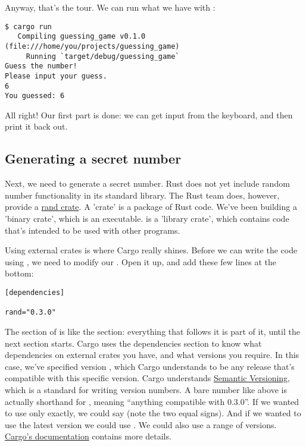 \blank

Anyway, that's the tour. We can run what we have with :

\begin{verbatim}
$ cargo run
   Compiling guessing_game v0.1.0 (file:///home/you/projects/guessing_game)
     Running `target/debug/guessing_game`
Guess the number!
Please input your guess.
6
You guessed: 6
\end{verbatim}

All right! Our first part is done: we can get input from the keyboard, and then print it back out.

\subsection{Generating a secret number}

Next, we need to generate a secret number. Rust does not yet include random number functionality in its standard library. 
The Rust team does, however, provide a \href{https://crates.io/crates/rand}{rand crate}. A 'crate' is a package of Rust 
code. We've been building a 'binary crate', which is an executable.  is a 'library crate', which contains code 
that's intended to be used with other programs.

\blank

Using external crates is where Cargo really shines. Before we can write the code using , we need to modify our 
. Open it up, and add these few lines at the bottom:

\begin{verbatim}
[dependencies]

rand="0.3.0"
\end{verbatim}

The \code{[dependencies]} section of  is like the \code{[package]} section: everything that follows it is part 
of it, until the next section starts. Cargo uses the dependencies section to know what dependencies on external crates you have, 
and what versions you require. In this case, we've specified version , which Cargo understands to be any release that's
compatible with this specific version. Cargo understands \href{http://semver.org/}{Semantic Versioning}, which is a standard for
writing version numbers. A bare number like above is actually shorthand for , meaning \enquote{anything compatible 
with 0.3.0}. If we wanted to use only  exactly, we could say  (note the two equal signs). And if we
wanted to use the latest version we could use \code{*}. We could also use a range of versions. 
\href{http://doc.crates.io/crates-io.html}{Cargo's documentation} contains more details.

